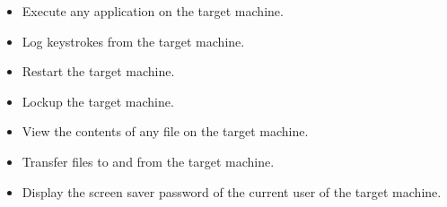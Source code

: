 \begin{itemize}
\item Execute any application on the target machine.
\item Log keystrokes from the target machine.
\item Restart the target machine.
\item Lockup the target machine.
\item View the contents of any file on the target machine.
\item Transfer files to and from the target machine.
\item Display the screen saver password of the current user of the target machine. 
\end{itemize}






